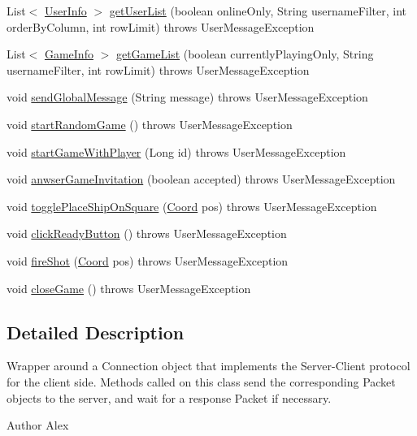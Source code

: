 \begin{DoxyCompactItemize}
\item 
List$<$ \hyperlink{classpt_1_1up_1_1fe_1_1lpro1613_1_1sharedlib_1_1structs_1_1_user_info}{User\+Info} $>$ \hyperlink{classclient_1_1conn_1_1_server_a8512a2e59d7e29fb25b913220050060d}{get\+User\+List} (boolean online\+Only, String username\+Filter, int order\+By\+Column, int row\+Limit)  throws User\+Message\+Exception 
\item 
List$<$ \hyperlink{classpt_1_1up_1_1fe_1_1lpro1613_1_1sharedlib_1_1structs_1_1_game_info}{Game\+Info} $>$ \hyperlink{classclient_1_1conn_1_1_server_ab1f159361ca4682e87f2cea6224f094a}{get\+Game\+List} (boolean currently\+Playing\+Only, String username\+Filter, int row\+Limit)  throws User\+Message\+Exception 
\item 
void \hyperlink{classclient_1_1conn_1_1_server_acbe845e1fc6ba7857fcf6d01377f5432}{send\+Global\+Message} (String message)  throws User\+Message\+Exception 
\item 
void \hyperlink{classclient_1_1conn_1_1_server_afbeea330d5f40a6edd87387fa71bcc2d}{start\+Random\+Game} ()  throws User\+Message\+Exception 
\item 
void \hyperlink{classclient_1_1conn_1_1_server_a6336de53822bd12d42e8445a598f2838}{start\+Game\+With\+Player} (Long id)  throws User\+Message\+Exception 
\item 
void \hyperlink{classclient_1_1conn_1_1_server_a28692c894a8055b95dd493fbaec8b567}{anwser\+Game\+Invitation} (boolean accepted)  throws User\+Message\+Exception 
\item 
void \hyperlink{classclient_1_1conn_1_1_server_a9894c54137e6f203dd38a47fe3514c27}{toggle\+Place\+Ship\+On\+Square} (\hyperlink{classpt_1_1up_1_1fe_1_1lpro1613_1_1sharedlib_1_1utils_1_1_coord}{Coord} pos)  throws User\+Message\+Exception 
\item 
void \hyperlink{classclient_1_1conn_1_1_server_a7e54680c0fb053bee969c41f093aa5c4}{click\+Ready\+Button} ()  throws User\+Message\+Exception 
\item 
void \hyperlink{classclient_1_1conn_1_1_server_ab1d2fa19e855a803efff54edd2113d83}{fire\+Shot} (\hyperlink{classpt_1_1up_1_1fe_1_1lpro1613_1_1sharedlib_1_1utils_1_1_coord}{Coord} pos)  throws User\+Message\+Exception 
\item 
void \hyperlink{classclient_1_1conn_1_1_server_a5d1f1961306d3e06c895abc90dfddf9f}{close\+Game} ()  throws User\+Message\+Exception 
\end{DoxyCompactItemize}


\subsection{Detailed Description}
Wrapper around a Connection object that implements the Server-\/\+Client protocol for the client side. Methods called on this class send the corresponding {\ttfamily Packet} objects to the server, and wait for a response {\ttfamily Packet} if necessary. \begin{DoxyAuthor}{Author}
Alex 
\end{DoxyAuthor}



